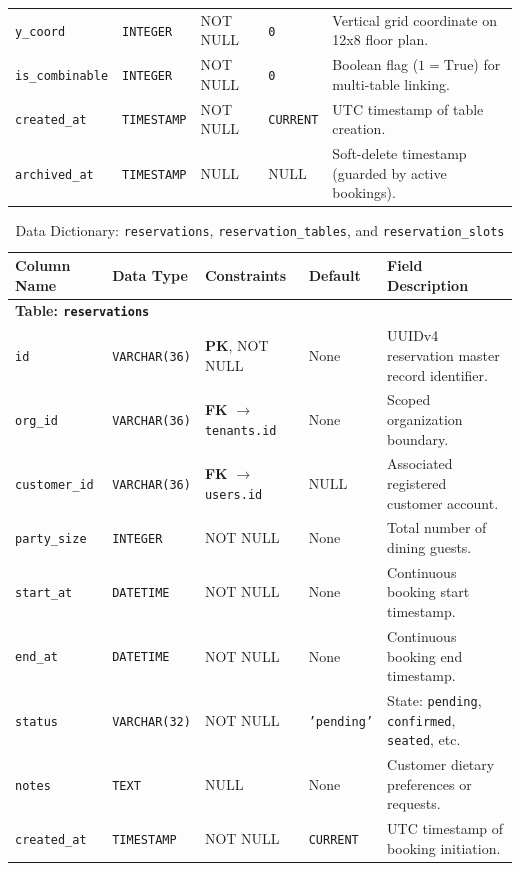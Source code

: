 \begin{table}[htbp]
\begin{tabularx}{\textwidth}{llp{3.2cm}lX}
\texttt{y\_coord} & \texttt{INTEGER} & NOT NULL & \texttt{0} & Vertical grid coordinate on 12x8 floor plan. \\
\texttt{is\_combinable}& \texttt{INTEGER}& NOT NULL & \texttt{0} & Boolean flag ($1 = \text{True}$) for multi-table linking. \\
\texttt{created\_at} & \texttt{TIMESTAMP} & NOT NULL & \texttt{CURRENT} & UTC timestamp of table creation. \\
\texttt{archived\_at}& \texttt{TIMESTAMP} & NULL & NULL & Soft-delete timestamp (guarded by active bookings). \\
\bottomrule
\end{tabularx}
\end{table}

\begin{table}[htbp]
\centering
\caption{Data Dictionary: \texttt{reservations}, \texttt{reservation\_tables}, and \texttt{reservation\_slots}}
\label{tab:dict_reservations}
\small
\begin{tabularx}{\textwidth}{llp{3.2cm}lX}
\toprule
\textbf{Column Name} & \textbf{Data Type} & \textbf{Constraints} & \textbf{Default} & \textbf{Field Description} \\
\midrule
\multicolumn{5}{l}{\textbf{Table: \texttt{reservations}}} \\
\texttt{id} & \texttt{VARCHAR(36)} & \textbf{PK}, NOT NULL & None & UUIDv4 reservation master record identifier. \\
\texttt{org\_id} & \texttt{VARCHAR(36)} & \textbf{FK} $\to$ \texttt{tenants.id} & None & Scoped organization boundary. \\
\texttt{customer\_id}& \texttt{VARCHAR(36)}& \textbf{FK} $\to$ \texttt{users.id} & NULL & Associated registered customer account. \\
\texttt{party\_size} & \texttt{INTEGER} & NOT NULL & None & Total number of dining guests. \\
\texttt{start\_at} & \texttt{DATETIME} & NOT NULL & None & Continuous booking start timestamp. \\
\texttt{end\_at} & \texttt{DATETIME} & NOT NULL & None & Continuous booking end timestamp. \\
\texttt{status} & \texttt{VARCHAR(32)} & NOT NULL & \texttt{'pending'} & State: \texttt{pending}, \texttt{confirmed}, \texttt{seated}, etc. \\
\texttt{notes} & \texttt{TEXT} & NULL & None & Customer dietary preferences or requests. \\
\texttt{created\_at} & \texttt{TIMESTAMP} & NOT NULL & \texttt{CURRENT} & UTC timestamp of booking initiation. \\

\end{tabularx}
\end{table}
